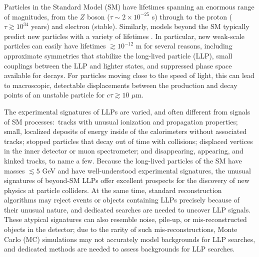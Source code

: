 Particles in the Standard Model (SM) have lifetimes spanning an enormous range of magnitudes, from the $Z$ boson ($\tau\sim2\times10^{-25}$ s) through to the proton ($\tau\gtrsim10^{34}$ years) and electron (stable). Similarly, models beyond the SM typically predict new particles with a variety of lifetimes \cite{massive-cite-dump}. In particular, new weak-scale particles can easily have lifetimes $\gtrsim10^{-12}$ m for several reasons, including approximate symmetries that stabilize the long-lived particle (LLP), small couplings between the LLP and lighter states, and suppressed phase space available for decays. For particles moving close to the speed of light, this can lead to macroscopic, detectable displacements between the production and decay points of an unstable particle for $c\tau\gtrsim 10\,\,\mu\mathrm{m}$.

The experimental signatures of LLPs are varied, and often different from signals of SM processes:~tracks with unusual ionization and propagation properties; small, localized deposits of energy inside of the calorimeters without associated tracks; stopped particles that decay out of time with collisions; displaced vertices in the inner detector or muon spectrometer; and disappearing, appearing, and kinked tracks, to name a few. Because the long-lived particles of the SM have masses $\lesssim5$ GeV and have well-understood experimental signatures, the unusual signatures of beyond-SM LLPs offer excellent prospects for the discovery of new physics at particle colliders. At the same time, standard reconstruction algorithms may reject events or objects containing LLPs precisely because of their unusual nature, and dedicated searches are needed to uncover LLP signals. These atypical signatures can also resemble noise, pile-up, or mis-reconstructed objects in the detector; due to the rarity of such mis-reconstructions, Monte Carlo (MC) simulations may not accurately model backgrounds for LLP searches, and dedicated methods are needed to assess backgrounds for LLP searches.

